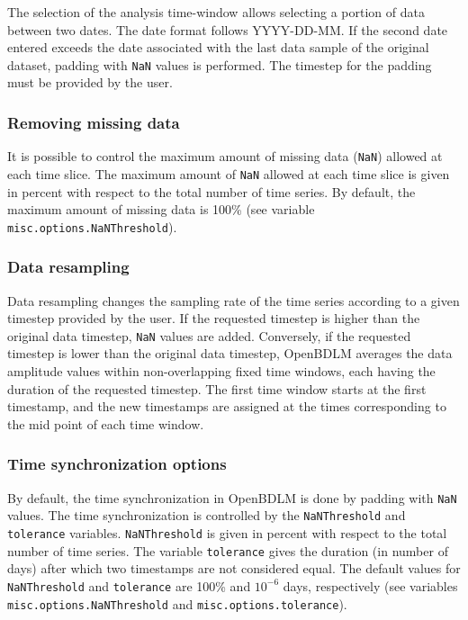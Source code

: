 The selection of the analysis time-window allows selecting a portion of data between two dates.
The date format follows \textquotesingle YYYY-DD-MM\textquotesingle {}.
If the second date entered exceeds the date associated with the last data sample of the original dataset, padding with \lstinline[basicstyle = \mlttfamily \small ]!NaN! values is performed. 
The timestep for the padding must be provided by the user.

\subsubsection{Removing missing data}
\label{SS:MissingDataRemoval}

It is possible to control the maximum amount of missing data (\lstinline[basicstyle = \mlttfamily \small ]!NaN!) allowed at each time slice. 
The maximum amount of \lstinline[basicstyle = \mlttfamily \small ]!NaN! allowed at each time slice is given in percent with respect to the total number of time series.
By default, the maximum amount of missing data is 100\% (see variable \lstinline[basicstyle = \mlttfamily \small ]!misc.options.NaNThreshold!).

\subsubsection{Data resampling}
\label{SS:DataResampling}
Data resampling changes the sampling rate of the time series according to a given timestep provided by the user. 
If the requested timestep is higher than the original data timestep, \lstinline[basicstyle = \mlttfamily \small ]!NaN! values are added.
Conversely, if the requested timestep is lower than the original  data timestep, OpenBDLM averages the data amplitude values within non-overlapping fixed time windows, each having the duration of the requested timestep.
The first time window starts at the first timestamp, and the new timestamps are assigned at the times corresponding to the mid point of each time window.

\subsubsection{Time synchronization options}
\label{SS:synchronization}
By default, the time synchronization in OpenBDLM is done by padding with \lstinline[basicstyle = \mlttfamily \small ]!NaN! values.
The time synchronization is controlled by the \lstinline[basicstyle = \mlttfamily \small ]!NaNThreshold! and \lstinline[basicstyle = \mlttfamily \small ]!tolerance! variables.
\lstinline[basicstyle = \mlttfamily \small ]!NaNThreshold!  is given in percent with respect to the total number of time series.
The variable \lstinline[basicstyle = \mlttfamily \small ]!tolerance! gives the duration (in number of days) after which two timestamps are not considered equal.
The default values for \lstinline[basicstyle = \mlttfamily \small ]!NaNThreshold!  and \lstinline[basicstyle = \mlttfamily \small ]!tolerance! are 100\% and $10^{-6}$ days, respectively (see variables \lstinline[basicstyle = \mlttfamily \small ]!misc.options.NaNThreshold! and \lstinline[basicstyle = \mlttfamily \small ]!misc.options.tolerance!). %

